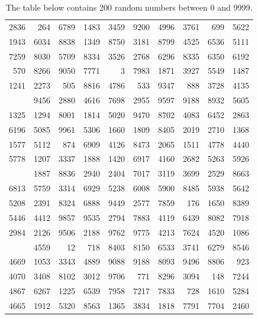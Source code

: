 \documentclass[
]{book}
\begin{document}
\begin{table}[t]

\caption{\label{tab:A1}The table below contains 200 random numbers between 0 and 9999.}
\centering
\begin{tabular}{rrrrrrrrrr}
\toprule
 &  &  &  &  &  &  &  &  & \\
\midrule
2836 & 264 & 6789 & 1483 & 3459 & 9200 & 4996 & 3761 & 699 & 5622\\
1943 & 6034 & 8838 & 1349 & 8750 & 3181 & 8799 & 4525 & 6536 & 5111\\
7259 & 8030 & 5709 & 8334 & 3526 & 2768 & 6296 & 8335 & 6350 & 6192\\
570 & 8266 & 9050 & 7771 & 3 & 7983 & 1871 & 3927 & 5549 & 1487\\
1241 & 2273 & 505 & 8816 & 4786 & 533 & 9347 & 888 & 3728 & 4135\\
\addlinespace
6688 & 9456 & 2880 & 4616 & 7698 & 2955 & 9597 & 9188 & 8932 & 5605\\
1325 & 1294 & 8001 & 1814 & 5020 & 9470 & 8702 & 4083 & 6452 & 2863\\
6196 & 5085 & 9961 & 5306 & 1660 & 1809 & 8405 & 2019 & 2710 & 1368\\
1577 & 5112 & 874 & 6909 & 4126 & 8473 & 2065 & 1511 & 4778 & 4440\\
5778 & 1207 & 3337 & 1888 & 1420 & 6917 & 4160 & 2682 & 5263 & 5926\\
\addlinespace
6635 & 1887 & 8836 & 2940 & 2404 & 7017 & 3119 & 3699 & 2529 & 8663\\
6813 & 5759 & 3314 & 6929 & 5238 & 6008 & 5900 & 8485 & 5938 & 5642\\
5208 & 2391 & 8324 & 6888 & 9449 & 2577 & 7859 & 176 & 1650 & 8389\\
5446 & 4412 & 9857 & 9535 & 2794 & 7883 & 4119 & 6439 & 8082 & 7918\\
2984 & 2126 & 9506 & 2188 & 9762 & 9775 & 4213 & 7624 & 4520 & 1086\\
\addlinespace
371 & 4559 & 12 & 718 & 8403 & 8150 & 6533 & 3741 & 6279 & 8546\\
4669 & 1053 & 3343 & 4889 & 9088 & 9188 & 8093 & 9496 & 8806 & 923\\
4070 & 3408 & 8102 & 3012 & 9706 & 771 & 8296 & 3094 & 148 & 7244\\
4867 & 6267 & 1225 & 6539 & 7958 & 7217 & 7833 & 728 & 1610 & 5284\\
4665 & 1912 & 5320 & 8563 & 1365 & 3834 & 1818 & 7791 & 7704 & 2460\\
\bottomrule
\end{tabular}
\end{table}

  
\end{document}
